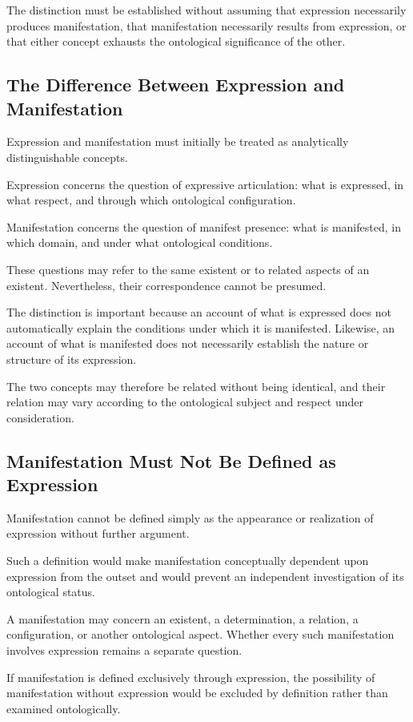 The distinction must be established without assuming that
expression necessarily produces manifestation, that manifestation
necessarily results from expression, or that either concept
exhausts the ontological significance of the other.

\subsection{The Difference Between Expression and Manifestation}

Expression and manifestation must initially be treated as
analytically distinguishable concepts.

Expression concerns the question of expressive articulation:
what is expressed, in what respect, and through which
ontological configuration.

Manifestation concerns the question of manifest presence:
what is manifested, in which domain, and under what
ontological conditions.

These questions may refer to the same existent or to related
aspects of an existent. Nevertheless, their correspondence
cannot be presumed.

The distinction is important because an account of what is
expressed does not automatically explain the conditions under
which it is manifested. Likewise, an account of what is
manifested does not necessarily establish the nature or
structure of its expression.

The two concepts may therefore be related without being
identical, and their relation may vary according to the
ontological subject and respect under consideration.

\subsection{Manifestation Must Not Be Defined as Expression}

Manifestation cannot be defined simply as the appearance
or realization of expression without further argument.

Such a definition would make manifestation conceptually
dependent upon expression from the outset and would prevent
an independent investigation of its ontological status.

A manifestation may concern an existent, a determination,
a relation, a configuration, or another ontological aspect.
Whether every such manifestation involves expression remains
a separate question.

If manifestation is defined exclusively through expression,
the possibility of manifestation without expression would
be excluded by definition rather than examined ontologically.

